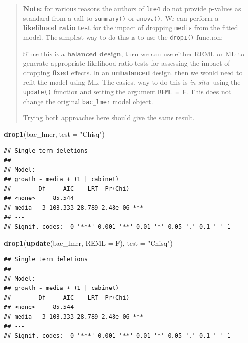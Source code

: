 \documentclass[]{book}
\newenvironment{Shaded}{\begin{snugshade}}{\end{snugshade}}
\newcommand{\KeywordTok}[1]{\textcolor[rgb]{0.13,0.29,0.53}{\textbf{#1}}}
\newcommand{\DataTypeTok}[1]{\textcolor[rgb]{0.13,0.29,0.53}{#1}}
\newcommand{\StringTok}[1]{\textcolor[rgb]{0.31,0.60,0.02}{#1}}
\newcommand{\NormalTok}[1]{#1}
\theoremstyle{definition}
\theoremstyle{definition}
\theoremstyle{definition}
\theoremstyle{remark}
\begin{document}
\begin{quote}
\textbf{Note:} for various reasons the authors of \texttt{lme4} do not
provide p-values as standard from a call to \texttt{summary()} or
\texttt{anova()}. We can perform a \textbf{likelihood ratio test} for
the impact of dropping \texttt{media} from the fitted model. The
simplest way to do this is to use the \texttt{drop1()} function:

Since this is a \textbf{balanced design}, then we can use either REML or
ML to generate appropriate likelihood ratio tests for assessing the
impact of dropping \textbf{fixed} effects. In an \textbf{unbalanced}
design, then we would need to refit the model using ML. The easiest way
to do this is \emph{in situ}, using the \texttt{update()} function and
setting the argument \texttt{REML\ =\ F}. This does not change the
original \texttt{bac\_lmer} model object.

Trying both approaches here should give the same result.
\end{quote}

\begin{Shaded}
\begin{Highlighting}[]
\KeywordTok{drop1}\NormalTok{(bac_lmer, }\DataTypeTok{test =} \StringTok{"Chisq"}\NormalTok{)}
\end{Highlighting}
\end{Shaded}

\begin{verbatim}
## Single term deletions
## 
## Model:
## growth ~ media + (1 | cabinet)
##        Df     AIC    LRT  Pr(Chi)    
## <none>     85.544                    
## media   3 108.333 28.789 2.48e-06 ***
## ---
## Signif. codes:  0 '***' 0.001 '**' 0.01 '*' 0.05 '.' 0.1 ' ' 1
\end{verbatim}

\begin{Shaded}
\begin{Highlighting}[]
\KeywordTok{drop1}\NormalTok{(}\KeywordTok{update}\NormalTok{(bac_lmer, }\DataTypeTok{REML =}\NormalTok{ F), }\DataTypeTok{test =} \StringTok{"Chisq"}\NormalTok{)}
\end{Highlighting}
\end{Shaded}

\begin{verbatim}
## Single term deletions
## 
## Model:
## growth ~ media + (1 | cabinet)
##        Df     AIC    LRT  Pr(Chi)    
## <none>     85.544                    
## media   3 108.333 28.789 2.48e-06 ***
## ---
## Signif. codes:  0 '***' 0.001 '**' 0.01 '*' 0.05 '.' 0.1 ' ' 1
\end{verbatim}
\end{document}
